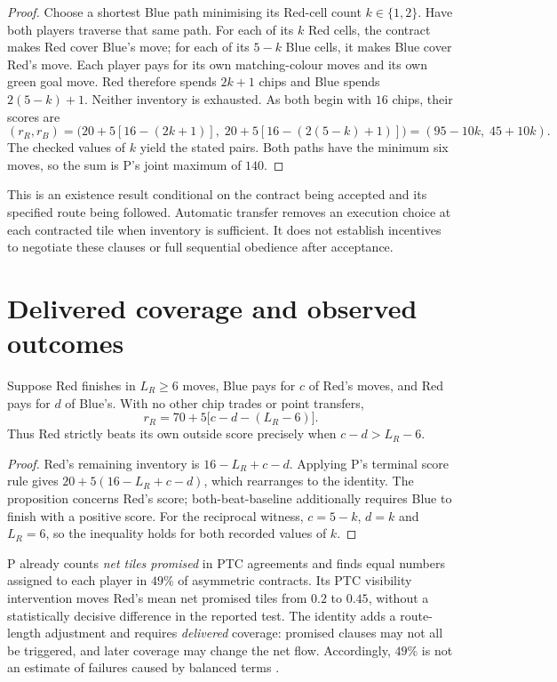\documentclass{article}
\begin{document}
\begin{proof}
Choose a shortest Blue path minimising its Red-cell count \(k\in\{1,2\}\). Have both players traverse that
same path. For each of its \(k\) Red cells, the contract makes Red cover Blue's move; for each of its \(5-k\)
Blue cells, it makes Blue cover Red's move. Each player pays for its own matching-colour moves and its own
green goal move. Red therefore spends \(2k+1\) chips and Blue spends \(2(5-k)+1\). Neither inventory is
exhausted. As both begin with \(16\) chips, their scores are
\[
(r_R,r_B)=\bigl(20+5[16-(2k+1)],\;20+5[16-(2(5-k)+1)]\bigr)
          =(95-10k,\;45+10k).
\]
The checked values of \(k\) yield the stated pairs. Both paths have the minimum six moves, so the sum is P's
joint maximum of \(140\). %
\end{proof}

This is an existence result conditional on the contract being accepted and its specified route being followed.
Automatic transfer removes an execution choice at each contracted tile when inventory is sufficient. It does
not establish incentives to negotiate these clauses or full sequential obedience after acceptance.

\section{Delivered coverage and observed outcomes}

\begin{proposition}
Suppose Red finishes in \(L_R\geq6\) moves, Blue pays for \(c\) of Red's moves, and Red pays for \(d\) of
Blue's. With no other chip trades or point transfers,
\[
r_R=70+5\bigl[c-d-(L_R-6)\bigr].
\]
Thus Red strictly beats its own outside score precisely when \(c-d>L_R-6\). %
\end{proposition}

\begin{proof}
Red's remaining inventory is \(16-L_R+c-d\). Applying P's terminal score rule gives \(20+5(16-L_R+c-d)\),
which rearranges to the identity. The proposition concerns Red's score; both-beat-baseline additionally
requires Blue to finish with a positive score. For the reciprocal witness, \(c=5-k\), \(d=k\) and \(L_R=6\),
so the inequality holds for both recorded values of \(k\). %
\end{proof}

P already counts \emph{net tiles promised} in PTC agreements and finds equal numbers assigned to each player
in \(49\%\) of asymmetric contracts. Its PTC visibility intervention moves Red's mean net promised tiles from
\(0.2\) to \(0.45\), without a statistically decisive difference in the reported test. The identity adds a
route-length adjustment and requires \emph{delivered} coverage: promised clauses may not all be triggered, and
later coverage may change the net flow. Accordingly, \(49\%\) is not an estimate of failures caused by
balanced terms \cite{wyse2026commitment}. %
\end{document}
